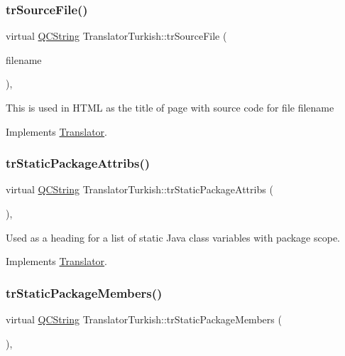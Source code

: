 \subsubsection{\texorpdfstring{trSourceFile()}{trSourceFile()}}
{\footnotesize\ttfamily virtual \mbox{\hyperlink{class_q_c_string}{Q\+C\+String}} Translator\+Turkish\+::tr\+Source\+File (\begin{DoxyParamCaption}\item[{\mbox{\hyperlink{class_q_c_string}{Q\+C\+String}} \&}]{filename }\end{DoxyParamCaption})\hspace{0.3cm}{\ttfamily [inline]}, {\ttfamily [virtual]}}

This is used in H\+T\+ML as the title of page with source code for file filename 

Implements \mbox{\hyperlink{class_translator}{Translator}}.

\mbox{\label{class_translator_turkish_a941806a19389e69cf551d757b9362965}} 
\subsubsection{\texorpdfstring{trStaticPackageAttribs()}{trStaticPackageAttribs()}}
{\footnotesize\ttfamily virtual \mbox{\hyperlink{class_q_c_string}{Q\+C\+String}} Translator\+Turkish\+::tr\+Static\+Package\+Attribs (\begin{DoxyParamCaption}{ }\end{DoxyParamCaption})\hspace{0.3cm}{\ttfamily [inline]}, {\ttfamily [virtual]}}

Used as a heading for a list of static Java class variables with package scope. 

Implements \mbox{\hyperlink{class_translator}{Translator}}.

\mbox{\label{class_translator_turkish_ad4f875d04acc8eddb4e3a28599bf260c}} 
\subsubsection{\texorpdfstring{trStaticPackageMembers()}{trStaticPackageMembers()}}
{\footnotesize\ttfamily virtual \mbox{\hyperlink{class_q_c_string}{Q\+C\+String}} Translator\+Turkish\+::tr\+Static\+Package\+Members (\begin{DoxyParamCaption}{ }\end{DoxyParamCaption})\hspace{0.3cm}{\ttfamily [inline]}, {\ttfamily [virtual]}}

